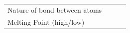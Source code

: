 \begin{enumerate}[noitemsep, label=\textbf{\arabic*}. ]
{\begin{tabular}[t]{|l|l|l|l|}
    
        Nature of bond between atoms &
    
    
         &
    
    
         &
    
    
     \tabularnewline\cline{1-1}\cline{2-2}\cline{3-3}\cline{4-4}
    
    
        Melting Point (high/low) &
    
    
         &
    
    
         &
    
    
     \tabularnewline\cline{1-1}\cline{2-2}\cline{3-3}\cline{4-4}
    

\end{tabular}}
\end{enumerate}
